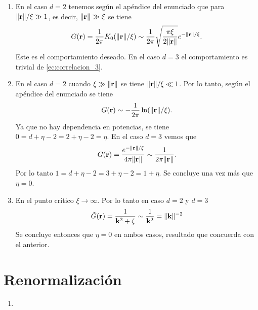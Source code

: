 \documentclass{article}
\begin{document}
\begin{enumerate}
\item En el caso $d=2$ tenemos según el apéndice del enunciado que para $\|\vb{r}\|/\xi\gg 1$, es decir, $\|\vb{r}\|\gg \xi$ se tiene
\begin{equation}
G(\vb{r})=\frac{1}{2\pi}K_0(\|\vb{r}\|/\xi)\sim\frac{1}{2\pi}\sqrt{\frac{\pi\xi}{2\|\vb{r}\|}}e^{-\|\vb{r}\|/\xi}.
\end{equation}
Este es el comportamiento deseado. En el caso $d=3$ el comportamiento es trivial de \eqref{ec:correlacion_3}.

\item En el caso $d=2$ cuando $\xi\gg\|\vb{r}\|$ se tiene $\|\vb{r}\|/\xi\ll 1$. Por lo tanto, según el apéndice del enunciado se tiene
\begin{equation}
G(\vb{r})\sim-\frac{1}{2\pi}\ln(\|\vb{r}\|/\xi).
\end{equation}
Ya que no hay dependencia en potencias, se tiene $0=d+\eta-2=2+\eta-2=\eta$. En el caso $d=3$ vemos que 
\begin{equation}
G(\vb{r})=\frac{e^{-\|\vb{r}\|/\xi}}{4\pi\|\vb{r}\|}\sim\frac{1}{2\pi\|\vb{r}\|}.
\end{equation}
Por lo tanto $1=d+\eta-2=3+\eta-2=1+\eta$. Se concluye una vez más que $\eta=0$.

\item En el punto crítico $\xi\rightarrow\infty$. Por lo tanto en caso $d=2$ y $d=3$
\begin{equation}
\tilde{G}(\vb{r})=\frac{1}{\vb{k}^2+\zeta}\sim\frac{1}{\vb{k}^2}=\|\vb{k}\|^{-2}
\end{equation}
Se concluye entonces que $\eta=0$ en ambos casos, resultado que concuerda con el anterior.

\end{enumerate}

\section{Renormalización}

\begin{enumerate}

\item 

\end{enumerate}



\end{document}
